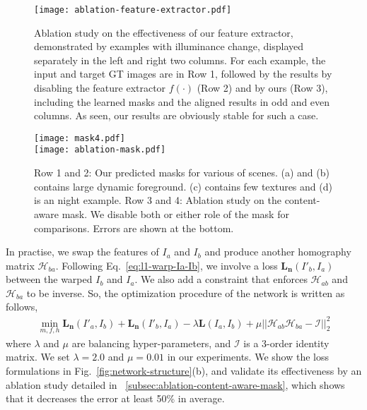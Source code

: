 \documentclass[runningheads]{llncs}
\begin{document}
\begin{figure*}[t]
  \centering
  \texttt{[image: ablation-feature-extractor.pdf]}\caption{Ablation study on the effectiveness of our feature extractor, demonstrated by examples with illuminance change, displayed separately in the left and right two columns. For each example, the input and target GT images are in Row 1, followed by the results by disabling the feature extractor $f(\cdot)$ (Row 2) and by ours (Row 3), including the learned masks and the aligned results in odd and even columns. As seen, our results are obviously stable for such a case.}
  \label{fig:ablation-feat-ext}
\end{figure*}

\begin{figure*}[t]
  \centering
  \texttt{[image: mask4.pdf]}\\
  \makebox[\linewidth]{\rule{0.95\linewidth}{0.4pt}}
  \texttt{[image: ablation-mask.pdf]}\caption{ Row 1 and 2: Our predicted masks for various of scenes. (a) and (b) contains large dynamic foreground. (c) contains few textures and (d) is an night example. Row 3 and 4: Ablation study on the content-aware mask. We disable both or either role of the mask for comparisons. Errors are shown at the bottom.}\label{fig:mask}
\end{figure*}

In practise, we swap the features of $I_a$ and $I_b$ and produce another homography matrix $\mathcal{H}_{ba}$. Following Eq.~\ref{eq:l1-warp-Ia-Ib}, we involve a loss $\mathbf{L_n}(I'_b,I_a)$ between the warped $I_b$ and $I_a$. We also add a constraint that enforces $\mathcal{H}_{ab}$ and $\mathcal{H}_{ba}$ to be inverse. So, the optimization procedure of the network is written as follows,
\begin{align}
\min_{m, f, h}  \mathbf{L_n}(I'_a, I_b) + \mathbf{L_n}(I'_b, I_a) - \lambda \mathbf{L}(I_a, I_b) + \mu ||\mathcal{H}_{ab}\mathcal{H}_{ba} - \mathcal{I}||_2^2
\label{eq:tripleloss}
\end{align}
 where $\lambda$ and $\mu$ are balancing hyper-parameters, and $\mathcal{I}$ is a 3-order identity matrix. We set $\lambda = 2.0$ and $\mu = 0.01$ in our experiments. We show the loss formulations in Fig.~\ref{fig:network-structure}(b), and validate its effectiveness by an ablation study detailed in \secname~\ref{subsec:ablation-content-aware-mask}, which shows that it decreases the error at least 50\% in average.
\end{document}
